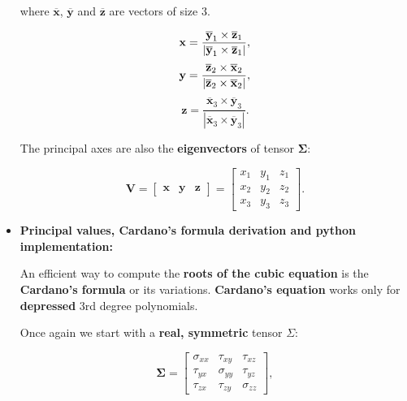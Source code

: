 \begin{itemize}
        where $\overline{\mathbf{x}}$, $\overline{\mathbf{y}}$ and $\overline{\mathbf{z}}$ are vectors of size 3.

        \begin{equation}
              \mathbf{x} = \frac{\overline{\mathbf{y}}_{1} \times \overline{\mathbf{z}}_{1}}
              {|\overline{\mathbf{y}}_{1} \times \overline{\mathbf{z}}_{1}|}\\
        ,\end{equation}
        \begin{equation}
              \mathbf{y} = \frac{\overline{\mathbf{z}}_{2} \times \overline{\mathbf{x}}_{2}}
              {|\overline{\mathbf{z}}_{2} \times \overline{\mathbf{x}}_{2}|}\\
        ,\end{equation}
        \begin{equation}
              \mathbf{z} = \frac{\overline{\mathbf{x}}_{3} \times \overline{\mathbf{y}}_{3}}
              {|\overline{\mathbf{x}}_{3} \times \overline{\mathbf{y}}_{3}|}
        .\end{equation}

        The principal axes are also the \textbf{eigenvectors} of tensor $\mathbf{\Sigma}$:

        \begin{equation}
            \mathbf{V} = \begin{bmatrix}
                \mathbf{x} & \mathbf{y} & \mathbf{z}
            \end{bmatrix} = \begin{bmatrix}
                x_1 & y_1 & z_1 \\
                x_2 & y_2 & z_2 \\
                x_3 & y_3 & z_3
            \end{bmatrix}
        .\end{equation}


    \item \textbf{Principal values, Cardano's formula derivation and python implementation:}

        An efficient way to compute the \textbf{roots of the cubic equation} is
        the \textbf{Cardano's formula} or its variations. \textbf{Cardano's equation}
        works only for \textbf{depressed} 3rd degree polynomials.

        Once again we start with a \textbf{real, symmetric} tensor $ \Sigma $:

        \begin{equation}
            \mathbf{\Sigma} = \begin{bmatrix}
                    \sigma_{xx} & \tau_{xy} & \tau_{xz} \\
                    \tau_{yx} & \sigma_{yy} & \tau_{yz} \\
                    \tau_{zx} & \tau_{zy} & \sigma_{zz}
            \end{bmatrix}
            \label{eqn:tensor}
        ,\end{equation}


\end{itemize}
